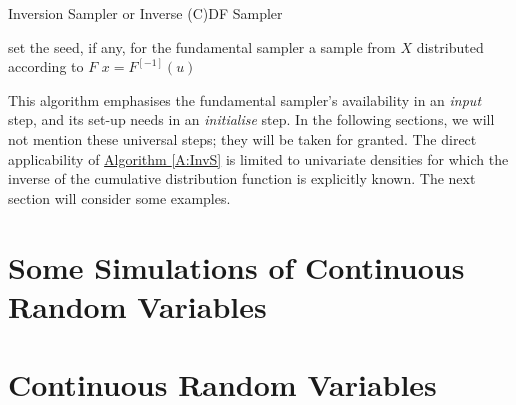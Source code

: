 \begin{algorithm}
\caption{Inversion Sampler or Inverse (C)DF Sampler}
\label{A:InvS}
\begin{algorithmic}[1]
 set the seed, if any, for the fundamental sampler
 a sample from $X$ distributed according to $F$
 $x = F^{[-1]}(u)$
\end{algorithmic}
\end{algorithm}
This algorithm emphasises the fundamental sampler's availability in an {\it input} step, and its set-up needs in an {\it initialise} step.  In the following sections, we will not mention these universal steps; they will be taken for granted.  The direct applicability of \hyperref[A:InvS]{Algorithm \ref*{A:InvS}} is limited to univariate densities for which the inverse of the cumulative distribution function is explicitly known.  The next section will consider some examples.

\section{Some Simulations of Continuous Random Variables}\label{S:InvSContinuousRVs}
\section{Continuous Random Variables}


